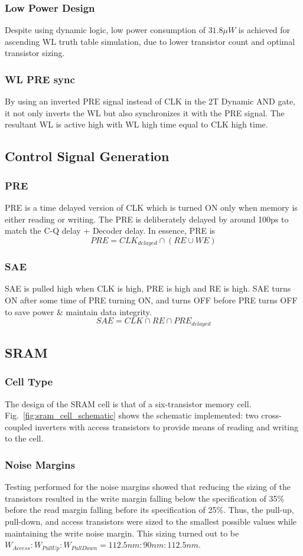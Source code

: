 \documentclass[conference]{IEEEtran}
\begin{document}
\subsubsection{Low Power Design}
Despite using dynamic logic, low power consumption of $31.8 \mu W$ is achieved for ascending WL truth table simulation, due to lower transistor count and optimal transistor sizing.  
\subsubsection{WL PRE sync}
By using an inverted PRE signal instead of CLK in the 2T Dynamic AND gate, it not only inverts the WL but also synchronizes it with the PRE signal. The resultant WL is active high with WL high time equal to CLK high time.
\subsection{Control Signal Generation}
\subsubsection{PRE}
PRE is a time delayed version of CLK which is turned ON only when memory is either reading or writing. The PRE is deliberately delayed by around 100ps to match the C-Q delay + Decoder delay. In essence, PRE is 
\[
    PRE = CLK_{delayed}\cap (RE\cup WE)
\]
\subsubsection{SAE}
SAE is pulled high when CLK is high, PRE is high and RE is high. SAE turns ON after some time of PRE turning ON, and turns OFF before PRE turns OFF to save power \& maintain data integrity. 
\[
    SAE = CLK\cap RE\cap PRE_{delayed}
\]
\subsection{SRAM}
\subsubsection{Cell Type}
The design of the SRAM cell is that of a six-transistor memory cell. Fig.~\ref{fig:sram_cell_schematic} shows the schematic implemented: two cross-coupled inverters with access transistors to provide means of reading and writing to the cell.
\subsubsection{Noise Margins}
Testing performed for the noise margins showed that reducing the sizing of the transistors resulted in the write margin falling below the specification of 35\% before the read margin falling before its specification of 25\%. Thus, the pull-up, pull-down, and access transistors were sized to the smallest possible values while maintaining the write noise margin. This sizing turned out to be $W_{Access}:W_{PullUp}:W_{PullDown} = 112.5nm:90nm:112.5nm$.
\end{document}
